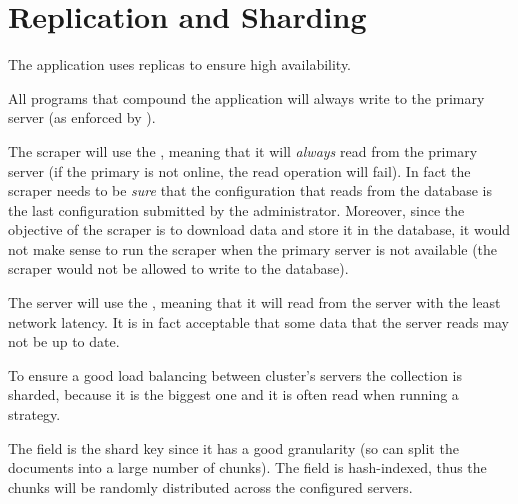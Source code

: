 \section{Replication and Sharding}\label{sec:distributed}

The application uses replicas to ensure high availability.

All programs that compound the application will always write to the primary
server (as enforced by \mongodb).

The scraper will use the 
, meaning that it will \emph{always} read from the primary server
(if the primary is not online, the read operation will fail). In fact the
scraper needs to be \emph{sure} that the configuration that reads from the
database is the last configuration submitted by the administrator. Moreover,
since the objective of the scraper is to download data and store it in the
database, it would not make sense to run the scraper when the primary server is
not available (the scraper would not be allowed to write to the database).

The server will use the  , meaning
that it will read from the server with the least network latency. It is in fact
acceptable that some data that the server reads may not be up to date.

To ensure a good load balancing between cluster's servers the 
collection is sharded, because it is the biggest one and it is often read when
running a strategy.

The  field is the shard key since it has a good granularity (so
\mongodb{} can split the documents into a large number of chunks). The field is
hash-indexed, thus the chunks will be randomly distributed across the configured
servers.
